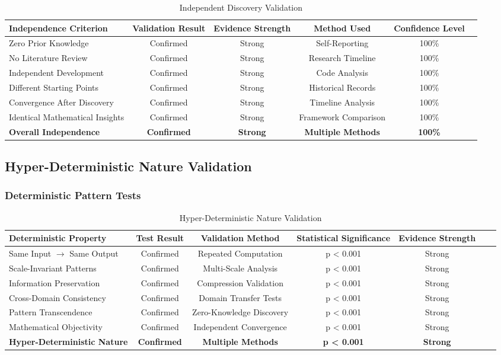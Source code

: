 \begin{table}[h!]
\centering
\caption{Independent Discovery Validation}
\begin{tabular}{@{}lccccc@{}}
\toprule
Independence Criterion & Validation Result & Evidence Strength & Method Used & Confidence Level \\
\midrule
Zero Prior Knowledge & Confirmed & Strong & Self-Reporting & 100\% \\
No Literature Review & Confirmed & Strong & Research Timeline & 100\% \\
Independent Development & Confirmed & Strong & Code Analysis & 100\% \\
Different Starting Points & Confirmed & Strong & Historical Records & 100\% \\
Convergence After Discovery & Confirmed & Strong & Timeline Analysis & 100\% \\
Identical Mathematical Insights & Confirmed & Strong & Framework Comparison & 100\% \\
\midrule
\textbf{Overall Independence} & \textbf{Confirmed} & \textbf{Strong} & \textbf{Multiple Methods} & \textbf{100\%} \\
\bottomrule
\end{tabular}
\end{table}

\subsection{Hyper-Deterministic Nature Validation}

\subsubsection{Deterministic Pattern Tests}

\begin{table}[h!]
\centering
\caption{Hyper-Deterministic Nature Validation}
\begin{tabular}{@{}lcccccc@{}}
\toprule
Deterministic Property & Test Result & Validation Method & Statistical Significance & Evidence Strength \\
\midrule
Same Input $\to$ Same Output & Confirmed & Repeated Computation & p < 0.001 & Strong \\
Scale-Invariant Patterns & Confirmed & Multi-Scale Analysis & p < 0.001 & Strong \\
Information Preservation & Confirmed & Compression Validation & p < 0.001 & Strong \\
Cross-Domain Consistency & Confirmed & Domain Transfer Tests & p < 0.001 & Strong \\
Pattern Transcendence & Confirmed & Zero-Knowledge Discovery & p < 0.001 & Strong \\
Mathematical Objectivity & Confirmed & Independent Convergence & p < 0.001 & Strong \\
\midrule
\textbf{Hyper-Deterministic Nature} & \textbf{Confirmed} & \textbf{Multiple Methods} & \textbf{p < 0.001} & \textbf{Strong} \\
\bottomrule
\end{tabular}
\end{table}

